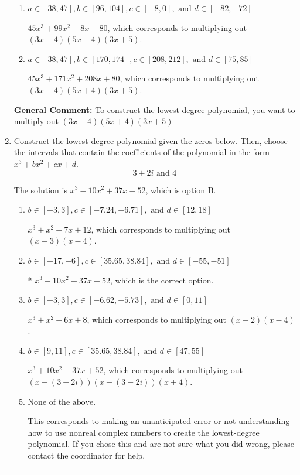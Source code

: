 \documentclass{extbook}[14pt]
\newcommand{\litem}[1]{\item #1

\rule{\textwidth}{0.4pt}}
\begin{document}
\begin{enumerate}
{\begin{enumerate}[label=\Alph*.]
$45x^{3} +51 x^{2} -88 x + 80$, which corresponds to multiplying everything correctly except the constant term.
\item \( a \in [38, 47], b \in [96, 104], c \in [-8, 0], \text{ and } d \in [-82, -72] \)

$45x^{3} +99 x^{2} -8 x -80$, which corresponds to multiplying out $(3x + 4)(5x -4)(3x + 5)$.
\item \( a \in [38, 47], b \in [170, 174], c \in [208, 212], \text{ and } d \in [75, 85] \)

$45x^{3} +171 x^{2} +208 x + 80$, which corresponds to multiplying out $(3x + 4)(5x + 4)(3x + 5)$.
\end{enumerate}

\textbf{General Comment:} To construct the lowest-degree polynomial, you want to multiply out $(3x -4)(5x + 4)(3x + 5)$
}
\litem{
Construct the lowest-degree polynomial given the zeros below. Then, choose the intervals that contain the coefficients of the polynomial in the form $x^3+bx^2+cx+d$.
\[ 3 + 2 i \text{ and } 4 \]

The solution is \( x^{3} -10 x^{2} +37 x -52 \), which is option B.\begin{enumerate}[label=\Alph*.]
\item \( b \in [-3, 3], c \in [-7.24, -6.71], \text{ and } d \in [12, 18] \)

$x^{3} + x^{2} -7 x + 12$, which corresponds to multiplying out $(x -3)(x -4)$.
\item \( b \in [-17, -6], c \in [35.65, 38.84], \text{ and } d \in [-55, -51] \)

* $x^{3} -10 x^{2} +37 x -52$, which is the correct option.
\item \( b \in [-3, 3], c \in [-6.62, -5.73], \text{ and } d \in [0, 11] \)

$x^{3} + x^{2} -6 x + 8$, which corresponds to multiplying out $(x -2)(x -4)$.
\item \( b \in [9, 11], c \in [35.65, 38.84], \text{ and } d \in [47, 55] \)

$x^{3} +10 x^{2} +37 x + 52$, which corresponds to multiplying out $(x-(3 + 2 i))(x-(3 - 2 i))(x + 4)$.
\item \( \text{None of the above.} \)

This corresponds to making an unanticipated error or not understanding how to use nonreal complex numbers to create the lowest-degree polynomial. If you chose this and are not sure what you did wrong, please contact the coordinator for help.
\end{enumerate}

}
\end{enumerate}
\end{document}
